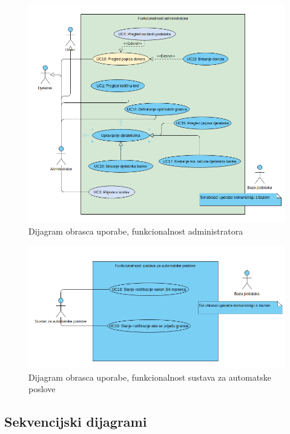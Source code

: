 \begin{figure}[H]
			\includegraphics[scale=0.6]{dijagrami/Funkcionalnosti_admina.png} %
			\centering
			\caption{Dijagram obrasca uporabe, funkcionalnost administratora}
			\label{fig:Funkcionalnosti_admina}
\end{figure}

\begin{figure}[H]
			\includegraphics[scale=0.6]{dijagrami/Funkcionalnosti_auto.png} %
			\centering
			\caption{Dijagram obrasca uporabe, funkcionalnost sustava za automatske poslove}
			\label{fig:Funkcionalnosti_auto}
\end{figure}

\eject
		
\subsection{Sekvencijski dijagrami}

